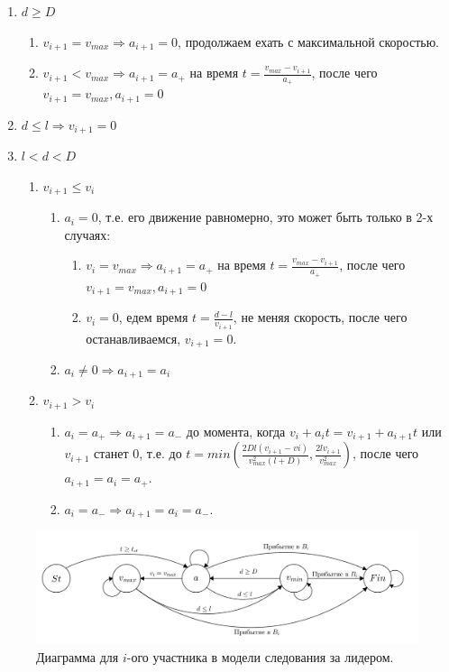 \documentclass[12pt, a4paper]{article}
\begin{document}
	
	\begin{enumerate}
		\item $d \ge D $
		\begin{enumerate}
			\item $v_{i+1} = v_{max} \Rightarrow a_{i+1} = 0$, продолжаем ехать с максимальной скоростью.
			\item $v_{i+1} < v_{max} \Rightarrow a_{i+1} = a_+$ на время $t = \frac{v_{max}-v_{i+1}}{a_+}$, после чего $v_{i+1} = v_{max}, a_{i+1} = 0$
		\end{enumerate}	
		\item $d \leq l \Rightarrow v_{i+1} = 0$
		\item $l < d < D $
		\begin{enumerate}
			\item $v_{i+1} \leq v_i$
			\begin{enumerate}
				\item $a_i = 0$, т.е. его движение равномерно, это может быть только в 2-х случаях:
				\begin{enumerate}
					\item $v_i = v_{max} \Rightarrow a_{i+1} = a_+$ на время $t = \frac{v_{max}-v_{i+1}}{a_+}$, после чего $v_{i+1} = v_{max}, a_{i+1} = 0$
					\item $v_i = 0$, едем время $t = \frac{d-l}{v_{i+1}}$, не меняя скорость, после чего останавливаемся, $v_{i+1} = 0$.
				\end{enumerate}	
				\item $a_i \neq 0 \Rightarrow a_{i+1} = a_i$ 
			\end{enumerate}
			\item $v_{i+1} > v_i$ 
			\begin{enumerate}
				\item $a_i = a_+ \Rightarrow a_{i+1} = a_-$ до момента, когда $v_i + a_it = v_{i+1} + a_{i+1}t$ или $v_{i+1}$ станет $0$, т.е. до $t = min\left(\frac{2Dl(v_{i+1}-vi)}{v^2_{max}(l+D)}, \frac{2lv_{i+1}}{v^2_{max}}\right)$,  после чего $a_{i+1} = a_i = a_+$. 
				\item $a_i = a_- \Rightarrow a_{i+1} = a_i = a_-$.
			\end{enumerate}	
		\end{enumerate}
	\end{enumerate}
	
	\fi
	\begin{figure}[H]
		\centering
		\includegraphics[scale=0.2]{Micro-gen.png}
		\caption{Диаграмма для $i$-ого участника в модели следования за лидером.}
		\label{ris:micro_diag}
	\end{figure}
	
\end{document}
